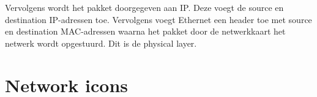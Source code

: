 Vervolgens wordt het pakket doorgegeven aan IP.
Deze voegt de source en destination IP-adressen toe.
Vervolgens voegt Ethernet een header toe met source en destination MAC-adressen waarna het pakket door de netwerkkaart het netwerk wordt opgestuurd.
Dit is de physical layer.


%




\section{Network icons}